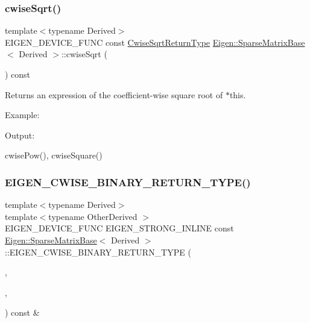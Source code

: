 \subsubsection{\texorpdfstring{cwiseSqrt()}{cwiseSqrt()}}
{\footnotesize\ttfamily template$<$typename Derived$>$ \\
E\+I\+G\+E\+N\+\_\+\+D\+E\+V\+I\+C\+E\+\_\+\+F\+U\+NC const \mbox{\hyperlink{class_eigen_1_1_cwise_unary_op}{Cwise\+Sqrt\+Return\+Type}} \mbox{\hyperlink{class_eigen_1_1_sparse_matrix_base}{Eigen\+::\+Sparse\+Matrix\+Base}}$<$ Derived $>$\+::cwise\+Sqrt (\begin{DoxyParamCaption}{ }\end{DoxyParamCaption}) const\hspace{0.3cm}{\ttfamily [inline]}}

\begin{DoxyReturn}{Returns}
an expression of the coefficient-\/wise square root of $\ast$this.
\end{DoxyReturn}
Example\+: 
\begin{DoxyCodeInclude}{0}
\end{DoxyCodeInclude}
 Output\+: 
\begin{DoxyVerbInclude}
\end{DoxyVerbInclude}
 cwise\+Pow(), cwise\+Square() \mbox{\label{class_eigen_1_1_sparse_matrix_base_af3616697987a1f7f20a5691fe8251e9d}} 
\subsubsection{\texorpdfstring{EIGEN\_CWISE\_BINARY\_RETURN\_TYPE()}{EIGEN\_CWISE\_BINARY\_RETURN\_TYPE()}}
{\footnotesize\ttfamily template$<$typename Derived$>$ \\
template$<$typename Other\+Derived $>$ \\
E\+I\+G\+E\+N\+\_\+\+D\+E\+V\+I\+C\+E\+\_\+\+F\+U\+NC E\+I\+G\+E\+N\+\_\+\+S\+T\+R\+O\+N\+G\+\_\+\+I\+N\+L\+I\+NE const \mbox{\hyperlink{class_eigen_1_1_sparse_matrix_base}{Eigen\+::\+Sparse\+Matrix\+Base}}$<$ Derived $>$\+::E\+I\+G\+E\+N\+\_\+\+C\+W\+I\+S\+E\+\_\+\+B\+I\+N\+A\+R\+Y\+\_\+\+R\+E\+T\+U\+R\+N\+\_\+\+T\+Y\+PE (\begin{DoxyParamCaption}\item[{Derived}]{,  }\item[{Other\+Derived}]{,  }\item[{product}]{ }\end{DoxyParamCaption}) const \&\hspace{0.3cm}{\ttfamily [inline]}}

